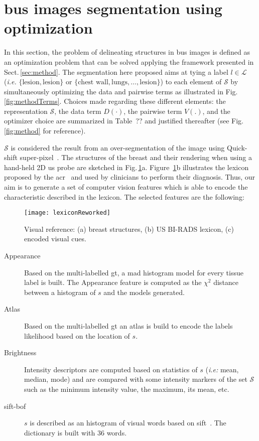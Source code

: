\section{\ac{bus} images segmentation using optimization}\label{sec:methodApp}
In this section, the problem of delineating structures in \ac{bus} images is defined as an optimization problem that can be solved applying the framework presented in Sect.\,\ref{sec:method}.
The segmentation here proposed aims at tying a label $l\in\mathcal{L}$ (\emph{i.e.} $\{\text{lesion}, \overline{\text{lesion}}\}$ or $\{ \text{chest wall}, \text{lungs}, \dots, \text{lesion} \}$) to each element of $\mathcal{S}$ by simultaneously optimizing the data and pairwise terms as illustrated in Fig.\,\ref{fig:methodTerms}.
Choices made regarding these different elements:
the representation $\mathcal{S}$, the data term $D(\cdot)$, the pairwise term $V(.)$, and the optimizer choice are summarized in Table~{\color{red}??} and justified thereafter (see Fig.\,\ref{fig:method} for reference).

$\mathcal{S}$ is considered the result from an over-segmentation of the image using Quick-shift super-pixel~\cite{achanta2012slic}. 
The structures of the breast and their rendering when using a hand-held 2D \ac{us} probe are sketched in Fig.\,\ref{fig:features}a. Figure~\ref{fig:features}b illustrates the lexicon proposed by the \ac{acr}~\cite{biradsus} and used by clinicians to perform their diagnosis. Thus, our aim is to generate a set of computer vision features which is able to encode the characteristic described in the lexicon. The selected features are the following:

\begin{figure}[t]
  \texttt{[image: lexiconReworked]}
    \caption {{\footnotesize Visual reference: (a) breast structures, (b) US BI-RADS lexicon, (c) encoded visual cues.}} 
    \label{fig:features}
\end{figure}




\begin{description}
  \item[Appearance] 
    Based on the multi-labelled \ac{gt}, a \ac{mad} histogram model for every tissue label is built. The Appearance feature is computed as the $\chi^2$ distance between a histogram of $s$ and the models generated.
  \item[Atlas] 
    Based on the multi-labelled \ac{gt} an atlas is build to encode the labels likelihood based on the location of $s$.
  \item[Brightness] 
    Intensity descriptors are computed based on statistics of $s$ (\emph{i.e:} mean, median, mode) and  are compared with some intensity markers of the set $\mathcal{S}$ such as the minimum intensity value, the maximum, its mean, etc.
  \item[\ac{sift}-\ac{bof}]
    $s$ is described as an histogram of visual words based on \ac{sift}~\cite{massich2014sift}. The dictionary is built with $36$ words.
\end{description}

